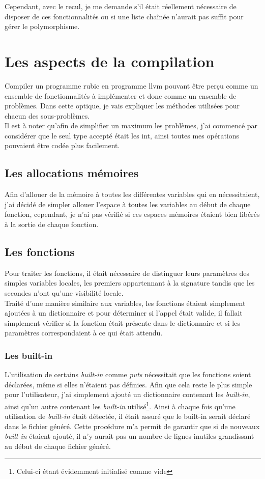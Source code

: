\documentclass[12pt]{article}
\begin{document}
Cependant, avec le recul, je me demande s'il était réellement nécessaire de
disposer de ces fonctionnalités ou si une liste chaînée n'aurait pas suffit
pour gérer le polymorphisme.

\section{Les aspects de la compilation}
Compiler un programme rubic en programme llvm pouvant être perçu comme un
ensemble de fonctionnalités à implémenter et donc comme un ensemble de
problèmes. Dans cette optique, je vais expliquer les méthodes utilisées pour
chacun des sous-problèmes.\\

Il est à noter qu'afin de simplifier un maximum les problèmes, j'ai commencé
par considérer que le seul type accepté était les int, ainsi toutes mes
opérations pouvaient être codée plus facilement.

\subsection{Les allocations mémoires}
Afin d'allouer de la mémoire à toutes les différentes variables qui en
nécessitaient, j'ai décidé de simpler allouer l'espace à toutes les
variables au début de chaque fonction, cependant, je n'ai pas vérifié si
ces espaces mémoires étaient bien libérés à la sortie de chaque fonction.

\subsection{Les fonctions}
Pour traiter les fonctions, il était nécessaire de distinguer leurs
paramètres des simples variables locales, les premiers appartennant à la
signature tandis que les secondes n'ont qu'une visibilité locale.\\

Traité d'une manière similaire aux variables, les fonctions étaient
simplement ajoutées à un dictionnaire et pour déterminer si l'appel était
valide, il fallait simplement vérifier si la fonction était présente dans le
dictionnaire et si les paramètres correspondaient à ce qui était attendu.

\subsubsection{Les built-in}
L'utilisation de certains {\em built-in} comme {\em puts} nécessitait que les
fonctions soient déclarées, même si elles n'étaient pas définies. Afin que
cela reste le plus simple pour l'utilisateur, j'ai simplement ajouté un
dictionnaire contenant les {\em built-in}, ainsi qu'un autre contenant les
{\em built-in} utilisé\footnote{Celui-ci étant évidemment initialisé comme
vide}. Ainsi à chaque fois qu'une utilisation de {\em built-in} était
détectée, il était assuré que le built-in serait déclaré dans le fichier
généré. Cette procédure m'a permit de garantir que si de nouveaux
{\em built-in} étaient ajouté, il n'y aurait pas un nombre de lignes inutiles
grandissant au début de chaque fichier généré.
\end{document}
